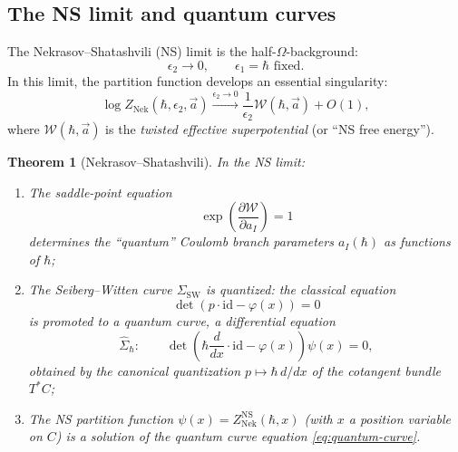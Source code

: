 \documentclass[11pt]{article}
\newtheorem{theorem}{Theorem}[section]
\theoremstyle{definition}
\theoremstyle{remark}
\newcommand{\cW}{\mathcal{W}}
\newcommand{\id}{\mathrm{id}}
\newcommand{\SW}{\mathrm{SW}}
\newcommand{\Nek}{\mathrm{Nek}}
\newcommand{\NS}{\mathrm{NS}}
\begin{document}
\subsection{The NS limit and quantum curves}
\label{subsec:ns-limit}

The Nekrasov--Shatashvili (NS) limit is the half-$\Omega$-background:
\begin{equation}
 \label{eq:ns-limit}
 \epsilon_2 \to 0, \qquad \epsilon_1 = \hbar \text{ fixed}.
\end{equation}
In this limit, the partition function develops an essential singularity:
\begin{equation}
 \label{eq:ns-free-energy}
 \log Z_{\Nek}(\hbar, \epsilon_2, \vec{a}) \xrightarrow{\epsilon_2 \to 0} \frac{1}{\epsilon_2} \cW(\hbar, \vec{a}) + O(1),
\end{equation}
where $\cW(\hbar, \vec{a})$ is the \emph{twisted effective superpotential} (or ``NS free energy'').

\begin{theorem}[Nekrasov--Shatashvili]
 \label{thm:ns-quantization}
 In the NS limit:
 \begin{enumerate}[label=(\roman*)]
 \item The saddle-point equation
 \begin{equation}
 \label{eq:ns-saddle}
 \exp\left(\frac{\partial \cW}{\partial a_I}\right) = 1
 \end{equation}
 determines the ``quantum'' Coulomb branch parameters $a_I(\hbar)$ as functions of $\hbar$;
 \item The Seiberg--Witten curve $\Sigma_{\SW}$ is \emph{quantized}: the classical equation
 \begin{equation}
 \label{eq:classical-curve}
 \det(p \cdot \id - \varphi(x)) = 0
 \end{equation}
 is promoted to a \emph{quantum curve}, a differential equation
 \begin{equation}
 \label{eq:quantum-curve}
 \widehat{\Sigma}_\hbar \colon \qquad \det\!\left(\hbar \frac{d}{dx} \cdot \id - \varphi(x)\right) \psi(x) = 0,
 \end{equation}
 obtained by the canonical quantization $p \mapsto \hbar \, d/dx$ of the cotangent bundle
 $T^*C$;
 \item The NS partition function $\psi(x) = Z_{\Nek}^{\NS}(\hbar, x)$ (with $x$ a position
 variable on $C$) is a solution of the quantum curve equation \eqref{eq:quantum-curve}.
 \end{enumerate}
\end{theorem}
\end{document}
